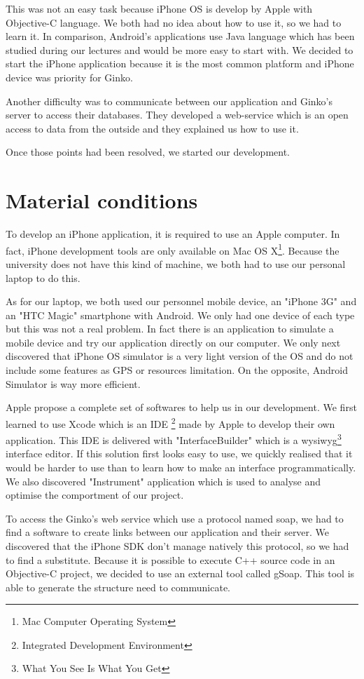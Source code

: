 \documentclass[a4paper, 12pt]{report}
\begin{document}
This was not an easy task because iPhone OS is develop by Apple with Objective-C language. We both had no idea about how to use it, so we had to learn it. In comparison, Android's applications use Java language which has been studied during our lectures and would be more easy to start with. We decided to start the iPhone application because it is the most common platform and iPhone device was priority for Ginko.

Another difficulty was to communicate between our application and Ginko's server to access their databases. They developed a web-service which is an open access to data from the outside and they explained us how to use it.

Once those points had been resolved, we started our development.


\section{Material conditions}

To develop an iPhone application, it is required to use an Apple computer. In fact, iPhone development tools are only available on Mac OS X\footnote{Mac Computer Operating System}. Because the university does not have this kind of machine, we both had to use our personal laptop to do this.

As for our laptop, we both used our personnel mobile device, an "iPhone 3G" and an "HTC Magic" smartphone with Android. We only had one device of each type but this was not a real problem. In fact there is an application to simulate a mobile device and try our application directly on our computer. We only next discovered that iPhone OS simulator is a very light version of the OS and do not include some features as GPS or resources limitation. On the opposite, Android Simulator is way more efficient. 

Apple propose a complete set of softwares to help us in our development. We first learned to use Xcode which is an IDE \footnote{Integrated Development Environment} made by Apple to develop their own application. This IDE is delivered with "InterfaceBuilder" which is a wysiwyg\footnote{What You See Is What You Get} interface editor. If this solution first looks easy to use, we quickly realised that it would be harder to use than to learn how to make an interface programmatically. We also discovered "Instrument" application which is used to analyse and optimise the comportment of our project.

To access the Ginko's web service which use a protocol named soap, we had to find a software to create links between our application and their server. We discovered that the iPhone SDK don't manage natively this protocol, so we had to find a substitute. Because it is possible to execute C++ source code in an Objective-C project, we decided to use an external tool called gSoap. This tool is able to generate the structure need to communicate.
\end{document}
